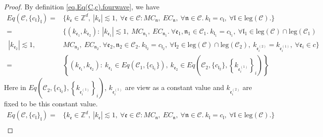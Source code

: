 \begin{proof} By definition \eqref{eq.Eq(C,c).fourwave}, we have
\begin{equation}
\begin{split}
 Eq(\mathcal{C},\{c_{\mathfrak{l}}\}_{\mathfrak{l}})=&\{k_{\mathfrak{e}}\in \mathbb{Z}^d,\ |k_{\mathfrak{e}}| \lesssim 1,\ \forall \mathfrak{e}\in \mathcal{C}:MC_{\mathfrak{n}},\  EC_{\mathfrak{n}},\ \forall \mathfrak{n}\in \mathcal{C}.\ k_{\mathfrak{l}}=c_{\mathfrak{l}},\ \forall \mathfrak{l}\in \text{leg}(\mathcal{C}).\} \\
 =&\{(k_{\mathfrak{e}_1},k_{\mathfrak{e}_2}):\ |k_{\mathfrak{e}_1}| \lesssim 1,\ MC_{\mathfrak{n}_1},\  EC_{\mathfrak{n}_1}.\ \forall \mathfrak{e}_1, \mathfrak{n}_1\in\mathcal{C}_1.\ k_{\mathfrak{l}_1}=c_{\mathfrak{l}_1},\ \forall \mathfrak{l}_1\in \text{leg}(\mathcal{C})\cap \text{leg}(\mathcal{C}_1)
 \\
 \ |k_{\mathfrak{e}_2}| \lesssim 1,\ &MC_{\mathfrak{n}_2},\  EC_{\mathfrak{n}_2}.\ \forall \mathfrak{e}_2, \mathfrak{n}_2\in\mathcal{C}_2.\ k_{\mathfrak{l}_2}=c_{\mathfrak{l}_2},\ \forall \mathfrak{l}_2\in \text{leg}(\mathcal{C})\cap \text{leg}(\mathcal{C}_2),\ k_{\mathfrak{e}_{i}^{(2)}}=k_{\mathfrak{e}_{i}^{(1)}},\ \forall\mathfrak{e}_{i}\in c\}
 \\
 =&\left\{(k_{\mathfrak{e}_1},k_{\mathfrak{e}_{2}}):\ k_{\mathfrak{e}_1}\in Eq(\mathcal{C}_1,\{c_{\mathfrak{l}_1}\}),\  k_{\mathfrak{e}_{2}}\in Eq\left(\mathcal{C}_{2}, \{c_{\mathfrak{l}_2}\}, \left\{k_{\mathfrak{e}_{i}^{(1)}}\right\}_{i}\right)\right\}
\end{split}
\end{equation}
Here in $Eq\left(\mathcal{C}_{2}, \{c_{\mathfrak{l}_2}\}, \left\{k_{\mathfrak{e}_{i}^{(1)}}\right\}_{i}\right)$, $k_{\mathfrak{e}_{i}^{(1)}}$ are view as a constant value and $k_{\mathfrak{e}_{i}^{(2)}}$ are fixed to be this constant value.
\begin{equation}
 \begin{split}
 Eq(\mathcal{C},\{c_{\mathfrak{l}}\}_{\mathfrak{l}})=&\{k_{\mathfrak{e}}\in \mathbb{Z}^d,\ |k_{\mathfrak{e}}| \lesssim 1,\ \forall \mathfrak{e}\in \mathcal{C}:MC_{\mathfrak{n}},\  EC_{\mathfrak{n}},\ \forall \mathfrak{n}\in \mathcal{C}.\ k_{\mathfrak{l}}=c_{\mathfrak{l}},\ \forall \mathfrak{l}\in \text{leg}(\mathcal{C}).\} \\

\end{split}
\end{equation}
\end{proof}
